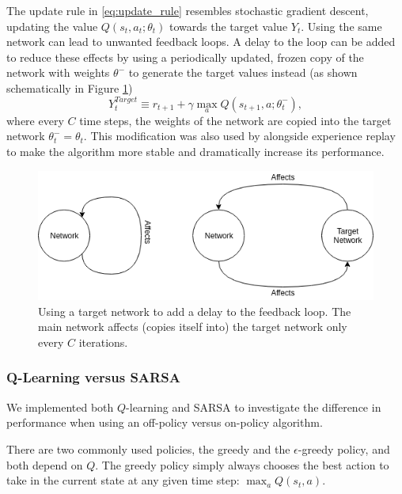 The update rule in \eqref{eq:update_rule} resembles stochastic gradient descent, updating the value $Q(s_t, a_t; \theta_t)$ towards the target value $Y_t$. Using the same network can lead to unwanted feedback loops. A delay to the loop can be added to reduce these effects by using a periodically updated, frozen copy of the network with weights $\theta^-$ to generate the target values instead (as shown schematically in Figure \ref{fig:targetnet})
\begin{equation}\label{eq:target_target}
    Y^{Target}_t \equiv r_{t+1} + \gamma \max_a Q(s_{t+1}, a; \theta_t^-),
\end{equation}
where every $C$ time steps, the weights of the network are copied into the target network $\theta_t^- = \theta_t$. This modification was also used by \cite{mnih2015human} alongside experience replay to make the algorithm more stable and dramatically increase its performance.

\begin{figure}[h]
    \centering
    \includegraphics[width=1\linewidth]{img/Target_Network.png}
    \caption{Using a target network to add a delay to the feedback loop. The main network affects (copies itself into) the target network only every $C$ iterations.}
    \label{fig:targetnet}
\end{figure}


\subsubsection{Q-Learning versus SARSA}\label{sec:ql_sarsa}
We implemented both $Q$-learning and SARSA to investigate the difference in performance when using an off-policy versus on-policy algorithm. 

There are two commonly used policies, the greedy and the $\epsilon$-greedy policy, and both depend on $Q$. The greedy policy simply always chooses the best action to take in the current state at any given time step: $\max_a Q(s_t, a)$. 

